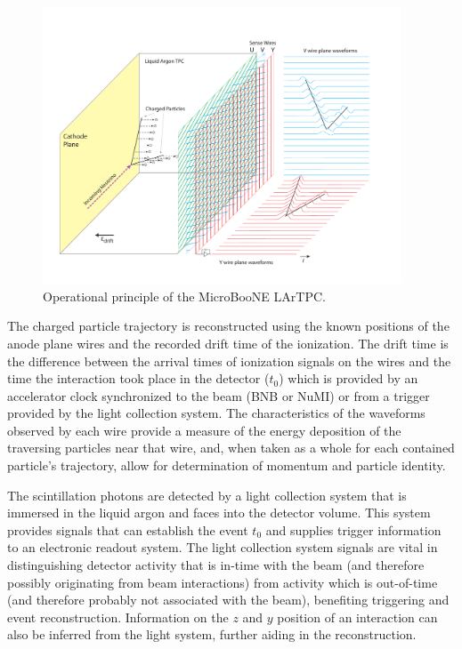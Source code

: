 \begin{figure}
\centering 
\includegraphics[width=0.95\textwidth]{figures/LArTPC_Concept}
\caption{Operational principle of the MicroBooNE LArTPC.}
\label{fig:lartpc}
\end{figure}


The charged particle trajectory is reconstructed using the known positions of the anode plane wires and the recorded drift time of the ionization.  The drift time is the difference between the arrival times of ionization signals on the wires and the time the interaction took place in the detector ($t_0$) which is provided by an accelerator clock synchronized to the beam (BNB or NuMI) or from a trigger provided by the light collection system.  The characteristics of the waveforms observed by each wire provide a measure of the energy deposition of the traversing particles near that wire, and, when taken as a whole for each contained particle's trajectory, allow for determination of momentum and particle identity. 


The scintillation photons are detected by a light collection system that is immersed in the liquid argon and faces into the detector volume.  This system provides signals that can establish the event $t_0$ and supplies trigger information to an electronic readout system.  The light collection system signals are vital in distinguishing detector activity that is in-time with the beam (and therefore possibly originating from beam interactions) from activity which is out-of-time (and therefore probably not associated with the beam), benefiting triggering and event reconstruction.  Information on the $z$ and $y$ position of an interaction can also be inferred from the light system, further aiding in the reconstruction.  


